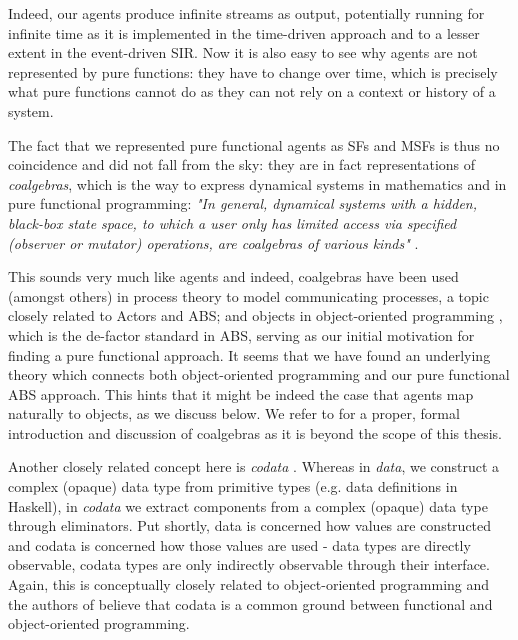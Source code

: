 Indeed, our agents produce infinite streams as output, potentially running for infinite time as it is implemented in the time-driven approach and to a lesser extent in the event-driven SIR. Now it is also easy to see why agents are not represented by pure functions: they have to change over time, which is precisely what pure functions cannot do as they can not rely on a context or history of a system.

The fact that we represented pure functional agents as SFs and MSFs is thus no coincidence and did not fall from the sky: they are in fact representations of \textit{coalgebras}, which is the way to express dynamical systems in mathematics and in pure functional programming: \textit{"In general, dynamical systems with a hidden, black-box state space, to which a user only has limited access via specified (observer or mutator) operations, are coalgebras of various kinds"} \cite{jacobs_tutorial_1997}.

This sounds very much like agents and indeed, coalgebras have been used (amongst others) in process theory to model communicating processes, a topic closely related to Actors and ABS; and objects in object-oriented programming \cite{jacobs_coalgebras_2003}, which is the de-factor standard in ABS, serving as our initial motivation for finding a pure functional approach. It seems that we have found an underlying theory which connects both object-oriented programming and our pure functional ABS approach. This hints that it might be indeed the case that agents map naturally to objects, as we discuss below. We refer to \cite{jacobs_tutorial_1997, jacobs_introduction_2017} for a proper, formal introduction and discussion of coalgebras as it is beyond the scope of this thesis.


\medskip

Another closely related concept here is \textit{codata} \cite{downen_codata_2019}. Whereas in \textit{data}, we construct a complex (opaque) data type from primitive types (e.g. data definitions in Haskell), in \textit{codata} we extract components from a complex (opaque) data type through eliminators. Put shortly, data is concerned how values are constructed and codata is concerned how those values are used \cite{downen_codata_2019} - data types are directly observable, codata types are only indirectly observable through their interface. Again, this is conceptually closely related to object-oriented programming and the authors of \cite{downen_codata_2019} believe that codata is a common ground between functional and object-oriented programming.

